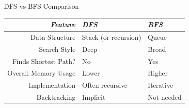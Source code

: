 \documentclass[14pt,aspectratio=1610]{beamer}
\begin{document}
\begin{frame}{DFS vs BFS Comparison }
  \begin{tabular}{r l l}
    \toprule
      \emph{Feature}	& \emph{DFS}	& \emph{BFS}\\
    \midrule
      Data Structure	& Stack (or recursion) &	Queue\\
      Search Style	& Deep	& Broad\\
      Finds Shortest Path? & No & Yes\\
      Overall Memory Usage	& Lower	& Higher\\
      Implementation	& Often recursive	& Iterative\\
      Backtracking	& Implicit	& Not needed\\
    \bottomrule
  \end{tabular}
\end{frame}
\end{document}
